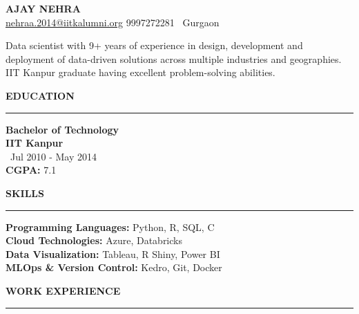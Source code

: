 \documentclass[a4paper,10pt]{article}
\begin{document}
\begin{center}
    \textbf{\LARGE \MakeUppercase{Ajay Nehra}} \\
    \vspace{1mm}
    \href{mailto:nehraa.2014@iitkalumni.org}{nehraa.2014@iitkalumni.org} \hspace{5mm} 9997272281 \hspace{5mm} \faMapMarker \,  Gurgaon
\end{center}

\vspace{1mm} %

Data scientist with 9+ years of experience in design, development and deployment of data-driven solutions across multiple industries and geographies. IIT Kanpur graduate having excellent problem-solving abilities.

\vspace{1mm}

\begin{multicols}{2}

\textbf{\LARGE \MakeUppercase{Education}} \\
\vspace{0mm}
\rule{\columnwidth}{0.8pt} %
\textbf{Bachelor of Technology} \\
\textbf{IIT Kanpur} \\
\faCalendar \, Jul 2010 - May 2014 \\
\textbf{CGPA:} 7.1

\columnbreak

\textbf{\LARGE \MakeUppercase{Skills}} \\
\vspace{0mm}
\rule{\columnwidth}{0.8pt} %
\textbf{Programming Languages:} Python, R, SQL, C \\
\textbf{Cloud Technologies:} Azure, Databricks \\
\textbf{Data Visualization:} Tableau, R Shiny, Power BI \\
\textbf{MLOps \& Version Control:} Kedro, Git, Docker

\end{multicols}

\vspace{1mm} %

\textbf{\LARGE \MakeUppercase{Work Experience}} \\
\vspace{1mm}
\rule{\textwidth}{0.8pt} %
\end{document}
